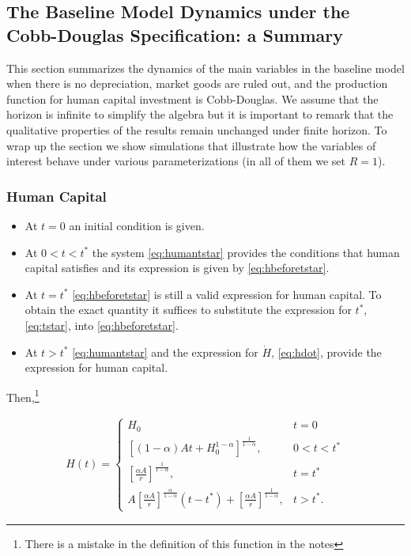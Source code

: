 \subsection{The Baseline Model Dynamics under the Cobb-Douglas Specification: a Summary}
This section summarizes the dynamics of the main variables in the baseline model when there is no depreciation, market goods are ruled out, and the production function for human capital investment is Cobb-Douglas. We assume that the horizon is infinite to simplify the algebra but it is important to remark that the qualitative properties of the results remain unchanged under finite horizon. To wrap up the section we show simulations that illustrate how the variables of interest behave under various parameterizations (in all of them we set $R = 1$). 

\subsubsection{Human Capital}
\begin{itemize}
\item At $t = 0$ an initial condition is given.
\item At $0 < t < t^*$ the system \eqref{eq:humantstar} provides the conditions that human capital satisfies and its expression is given by \eqref{eq:hbeforetstar}.
\item At $t = t^*$ \eqref{eq:hbeforetstar} is still a valid expression for human capital. To obtain the exact quantity it suffices to substitute the expression for $t^*$, \eqref{eq:tstar}, into \eqref{eq:hbeforetstar}.
\item At $ t > t^* $ \eqref{eq:humantstar} and the expression for $\dot{H}$, \eqref{eq:hdot}, provide the expression for human capital.
\end{itemize}

Then,\footnote{There is a mistake in the definition of this function in the notes}

\begin{eqnarray}
H(t) =
\begin{cases}
H_{0} & t = 0 \\
\left[ (1 - \alpha)At + H_{0}^{1-\alpha} \right]^{\frac{1}{1-\alpha}} , & 0 < t < t^* \\
\left[ \frac{\alpha A}{r} \right]^{\frac{1}{1 - \alpha}}, & t = t^* \\
A \left[ \frac{\alpha A}{r} \right]^{\frac{ \alpha }{1 - \alpha}} \left( t - t^* \right) + \left[ \frac{\alpha A}{r} \right]^{\frac{1}{1 - \alpha}} , & t > t^*. \label{eq:humancapall}
\end{cases}
\end{eqnarray}

